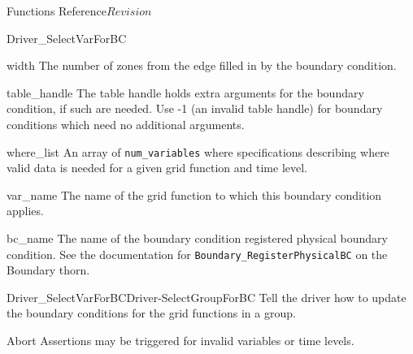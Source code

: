 \begin{cactuspart}{ Functions Reference}{}{$Revision$}
\begin{FunctionDescription}{Driver\_SelectVarForBC}
\begin{ParameterSection}
\begin{Parameter}{width}
The number of zones from the edge filled in by the boundary condition.
\end{Parameter}
\end{ParameterSection}

\begin{ParameterSection}
\begin{Parameter}{table\_handle}
The table handle holds extra arguments for the boundary condition, if such are needed. Use
-1 (an invalid table handle) for boundary conditions which need no additional arguments.
\end{Parameter}
\end{ParameterSection}

\begin{ParameterSection}
\begin{Parameter}{where\_list}
An array of \texttt{num\_variables} where specifications describing
where valid data is needed for a given grid function and time level.
\end{Parameter}
\end{ParameterSection}

\begin{ParameterSection}
\begin{Parameter}{var\_name}
The name of the grid function to which this boundary condition applies.
\end{Parameter}
\end{ParameterSection}

\begin{ParameterSection}
\begin{Parameter}{bc\_name}
The name of the boundary condition registered physical boundary condition.
See the documentation for \texttt{Boundary\_RegisterPhysicalBC} on the
Boundary thorn.
\end{Parameter}
\end{ParameterSection}

\begin{SeeAlsoSection}
\begin{SeeAlso2}{Driver\_SelectVarForBC}{Driver-SelectGroupForBC}
Tell the driver how to update the boundary conditions for the grid functions in a group.
\end{SeeAlso2}
\end{SeeAlsoSection}

\begin{ErrorSection}
\begin{Error}{Abort}
Assertions may be triggered for invalid variables or time levels.
\end{Error}
\end{ErrorSection}
\end{FunctionDescription}


\end{cactuspart}

